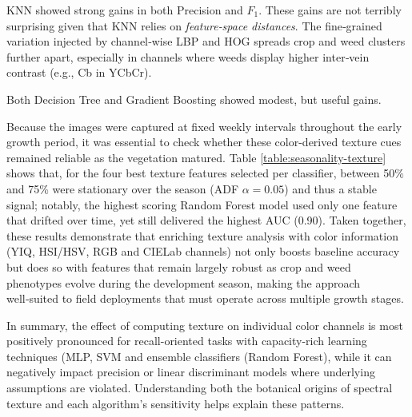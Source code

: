 \documentclass[letterpaper, notitlepage]{report}
\begin{document}
\gls{KNN} showed strong gains in both Precision and ${F}_1$. These gains are not terribly surprising given that \gls{KNN} relies on \textit{feature‑space distances}. The fine‑grained variation injected by channel‑wise LBP and HOG spreads crop and weed clusters further apart, especially in channels where weeds display higher inter‑vein contrast (e.g., Cb in YCbCr).

Both Decision Tree and Gradient Boosting showed modest, but useful gains.

Because the images were captured at fixed weekly intervals throughout the early growth period, 
it was essential to check whether these color-derived texture cues remained reliable as the vegetation matured. Table \ref{table:seasonality-texture} shows that, for the four best texture features selected per classifier, between 50\% and 75\% were stationary over the season (\gls{ADF} $\alpha = 0.05$) and thus a stable signal; notably, the highest scoring Random Forest model used only one feature that drifted over time, yet still delivered the highest \gls{AUC} (0.90). Taken together, these results demonstrate that enriching texture analysis with color information (YIQ, HSI/HSV, RGB and CIELab channels) not only boosts baseline accuracy but does so with features that remain largely robust as crop and weed phenotypes evolve during the development season, making the approach well‑suited to field deployments that must operate across multiple growth stages.

In summary, the effect of computing texture on individual color channels is most positively pronounced for recall-oriented tasks with capacity-rich learning techniques (\gls{MLP}, \gls{SVM} and ensemble classifiers (Random Forest), while it can negatively impact precision or linear discriminant models where underlying assumptions are violated. Understanding both the botanical origins of spectral texture and each algorithm's sensitivity helps explain these patterns.



\end{document}
